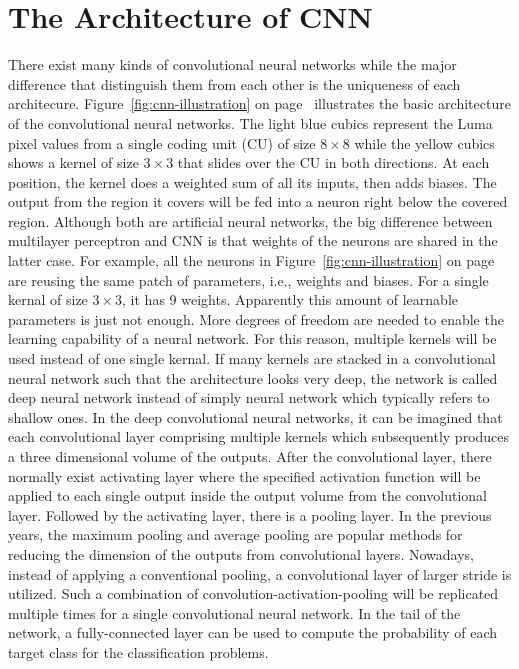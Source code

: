 \section{The Architecture of CNN}\label{sec:cnn}
There exist many kinds of convolutional neural networks while the 
major difference that distinguish them from each other
is the uniqueness of each architecure.
Figure~\ref{fig:cnn-illustration} on 
page~\pageref{fig:cnn-illustration}
illustrates the basic architecture
of the convolutional neural networks.
The light blue cubics represent the Luma pixel values from a single
coding unit (CU) of size \(8\times8\) while the yellow cubics
shows a kernel of size \(3\times3\) that slides over the
CU in both directions.
At each position, the kernel does a weighted sum of all its inputs,
then adds biases. The output from the
region it covers will be fed into a neuron right 
below the covered region.
Although both are artificial neural networks, 
the big difference between multilayer perceptron and 
CNN is that weights of the neurons are shared in the latter case.
For example, all the neurons in Figure~\ref{fig:cnn-illustration} on
page~\pageref{fig:cnn-illustration} are reusing the same patch of
parameters, i.e., weights and biases.
For a single kernal of size \(3\times3\), it has 9 weights.
Apparently this amount of learnable parameters is just not enough.
More degrees of freedom are needed to enable 
the learning capability of a neural network.
For this reason, multiple kernels will be used instead of one single kernal.
If many kernels are stacked in a convolutional neural network such that
the architecture looks very deep, the network is called deep neural network
instead of simply neural network which typically refers to shallow ones.
In the deep convolutional neural networks, it can be imagined that
each convolutional layer comprising multiple kernels which subsequently produces
a three dimensional volume of the outputs.
After the convolutional layer, there normally exist activating layer where
the specified activation function will be applied to each single output
inside the output volume from the convolutional layer.
Followed by the activating layer, there is a pooling layer.
In the previous years, the maximum pooling and average pooling 
are popular methods for reducing the dimension of the outputs
from convolutional layers.
Nowadays, instead of applying a conventional pooling, 
a convolutional layer of larger stride is utilized.
Such a combination of convolution-activation-pooling will
be replicated multiple times for a single convolutional neural network.
In the tail of the network, a fully-connected layer can be used
to compute the probability of each target class for the 
classification problems.

